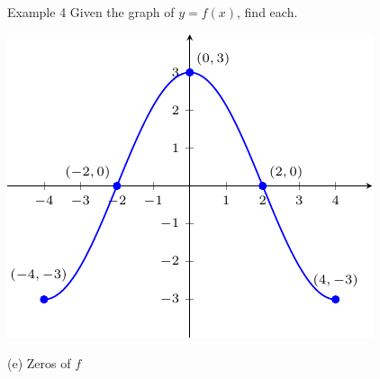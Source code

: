 \documentclass[t,usenames,dvipsnames]{beamer}
\begin{document}
\begin{frame}{Example 4}
Given the graph of $y=f(x)$, find each. \newline\\
\begin{minipage}{0.6\textwidth}
\includegraphics{example4.pdf}
\end{minipage}
\hspace{0.5cm}
\begin{minipage}{0.33\textwidth}
(e) Zeros of $f$  \\\\
 \\\\
 \\\\
\end{minipage}
\end{frame}
\end{document}
